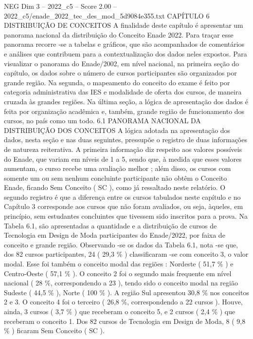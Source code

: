 \begin{textsample}{NEG Dim 3 – 2022\_c5 – Score 2.00 – 2022\_c5/enade\_2022\_tec\_des\_mod\_5d9084e355.txt}  \label{ex:f3_neg_224}
CAPÍTULO 6 DISTRIBUIÇÃO DE CONCEITOS A finalidade deste capítulo é apresentar um panorama nacional da distribuição do Conceito Enade 2022.
Para traçar esse panorama recorre -se a tabelas e gráficos, que são acompanhados de comentários e análises que contribuem para a contextualização dos dados neles expostos.
Para visualizar o panorama do Enade/2002, em nível nacional, na primeira seção do capítulo, os dados sobre o número de cursos participantes são organizados por grande região.
Na segunda, o mapeamento do conceito do exame é feito por categoria administrativa das IES e modalidade de oferta dos cursos, de maneira cruzada às grandes regiões.
Na última seção, a lógica de apresentação dos dados é feita por organização acadêmica e, também, grande região de funcionamento dos cursos, no país como um todo. 6.1 PANORAMA NACIONAL DA DISTRIBUIÇÃO DOS CONCEITOS A lógica adotada na apresentação dos dados, nesta seção e nas duas seguintes, pressupõe o registro de duas informações de natureza reiterativa.
A primeira informação diz respeito aos valores possíveis do Enade, que variam em níveis de 1 a 5, sendo que, à medida que esses valores aumentam, o curso recebe uma avaliação melhor ; além disso, os cursos com somente um ou sem nenhum concluinte participante não obtêm o Conceito Enade, ficando Sem Conceito ( SC ), como já ressaltado neste relatório.
O segundo registro é que a diferença entre os cursos tabulados neste capítulo e no Capítulo 3 corresponde aos cursos que não foram avaliados, ou seja, àqueles, em princípio, sem estudantes concluintes que tivessem sido inscritos para a prova.
Na Tabela 6.1, são apresentadas a quantidade e a distribuição de cursos de Tecnologia em Design de Moda participantes do Enade/2022, por faixa de conceito e grande região.
Observando -se os dados da Tabela 6.1, nota -se que, dos 82 cursos participantes, 24 ( 29,3 \% ) classificaram -se com conceito 3, o valor modal.
Esse foi também o conceito modal das regiões : Nordeste ( 51,7 \% ) e Centro-Oeste ( 57,1 \% ).
O conceito 2 foi o segundo mais frequente em nível nacional ( 28 \%, correspondendo a 23 ), tendo sido o conceito modal na região Sudeste ( 44,5 \% ), Norte ( 100 \% ).
A região Sul apresentou 30,8 \% nos conceitos 2 e 3.
O conceito 4 foi o terceiro ( 26,8 \%, correspondendo a 22 cursos ).
Houve, ainda, 3 cursos ( 3,7 \% ) que receberam o conceito 5, e 2 cursos ( 2,4 \% ) que receberam o conceito 1.
Dos 82 cursos de Tecnologia em Design de Moda, 8 ( 9,8 \% ) ficaram Sem Conceito ( SC ).

\end{textsample}
